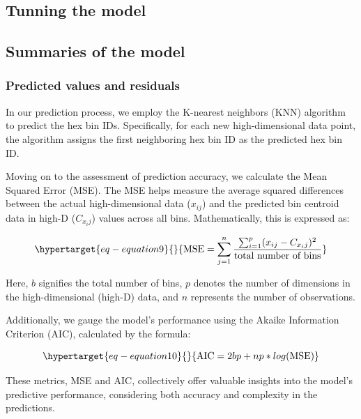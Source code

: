\documentclass[
  12pt]{article}
\begin{document}
\hypertarget{tunning-the-model}{%
\subsection{Tunning the model}\label{tunning-the-model}}

\hypertarget{sec-diagnostics}{%
\subsection{Summaries of the model}\label{sec-diagnostics}}

\hypertarget{predicted-values-and-residuals}{%
\subsubsection{Predicted values and
residuals}\label{predicted-values-and-residuals}}

In our prediction process, we employ the K-nearest neighbors (KNN)
algorithm to predict the hex bin IDs. Specifically, for each new
high-dimensional data point, the algorithm assigns the first neighboring
hex bin ID as the predicted hex bin ID.

Moving on to the assessment of prediction accuracy, we calculate the
Mean Squared Error (MSE). The MSE helps measure the average squared
differences between the actual high-dimensional data (\(x_{ij}\)) and
the predicted bin centroid data in high-D (\(C_{x_ij}\)) values across
all bins. Mathematically, this is expressed as:

\begin{equation}\protect\hypertarget{eq-equation9}{}{
\text{MSE} = \sum_{j = 1}^{n} \frac{\sum_{i = 1}^{p} (x_{ij} - C_{x_ij})^2}{\text{total number of bins}}
}\label{eq-equation9}\end{equation}

Here, \(b\) signifies the total number of bins, \(p\) denotes the number
of dimensions in the high-dimensional (high-D) data, and \(n\)
represents the number of observations.

Additionally, we gauge the model's performance using the Akaike
Information Criterion (AIC), calculated by the formula:

\begin{equation}\protect\hypertarget{eq-equation10}{}{
\text{AIC} = 2bp + np * log(\text{MSE})
}\label{eq-equation10}\end{equation}

These metrics, MSE and AIC, collectively offer valuable insights into
the model's predictive performance, considering both accuracy and
complexity in the predictions.
\end{document}
